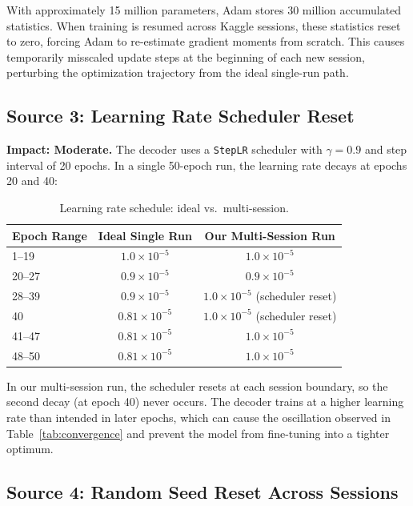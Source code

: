 \documentclass[12pt,a4paper]{article}
\begin{document}
With approximately 15 million parameters, Adam stores 30 million accumulated statistics. When training is resumed across Kaggle sessions, these statistics reset to zero, forcing Adam to re-estimate gradient moments from scratch. This causes temporarily misscaled update steps at the beginning of each new session, perturbing the optimization trajectory from the ideal single-run path.

\subsection{Source 3: Learning Rate Scheduler Reset}

\textbf{Impact: Moderate.} The decoder uses a \texttt{StepLR} scheduler with $\gamma = 0.9$ and step interval of 20 epochs. In a single 50-epoch run, the learning rate decays at epochs 20 and 40:

\begin{table}[H]
\centering
\caption{Learning rate schedule: ideal vs.\ multi-session.}
\label{tab:lr_schedule}
\begin{tabular}{@{}lcc@{}}
\toprule
\textbf{Epoch Range} & \textbf{Ideal Single Run} & \textbf{Our Multi-Session Run} \\
\midrule
1--19   & $1.0 \times 10^{-5}$ & $1.0 \times 10^{-5}$ \\
20--27  & $0.9 \times 10^{-5}$ & $0.9 \times 10^{-5}$ \\
28--39  & $0.9 \times 10^{-5}$ & $1.0 \times 10^{-5}$ (scheduler reset) \\
40      & $0.81 \times 10^{-5}$ & $1.0 \times 10^{-5}$ (scheduler reset) \\
41--47  & $0.81 \times 10^{-5}$ & $1.0 \times 10^{-5}$ \\
48--50  & $0.81 \times 10^{-5}$ & $1.0 \times 10^{-5}$ \\
\bottomrule
\end{tabular}
\end{table}

In our multi-session run, the scheduler resets at each session boundary, so the second decay (at epoch 40) never occurs. The decoder trains at a higher learning rate than intended in later epochs, which can cause the oscillation observed in Table~\ref{tab:convergence} and prevent the model from fine-tuning into a tighter optimum.

\subsection{Source 4: Random Seed Reset Across Sessions}
\end{document}
